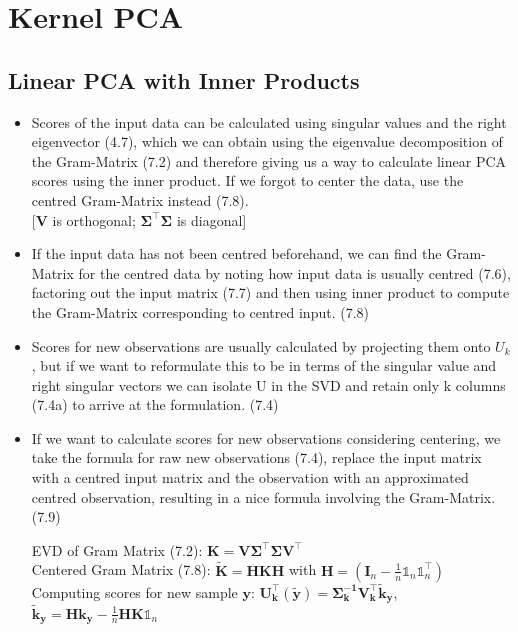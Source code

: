 \documentclass[english]{latex4ei/latex4ei_sheet}
\begin{document}
\vspace{300}
\section{Kernel PCA}
\begin{sectionbox}
\subsection{Linear PCA with Inner Products}
\begin{itemize}
\item Scores of the input data can be calculated using singular values and the right eigenvector (4.7), which we can obtain using the eigenvalue decomposition of the Gram-Matrix (7.2) and therefore giving us a way to calculate linear PCA scores using the inner product. If we forgot to center the data, use the centred Gram-Matrix instead (7.8).\\
\hspace{5}[$\mathbf{V}$ is orthogonal; $\mathbf{\Sigma}^{\top}\mathbf{\Sigma}$ is diagonal]
\item If the input data has not been centred beforehand, we can find the Gram-Matrix for the centred data by noting how input data is usually centred (7.6), factoring out the input matrix (7.7) and then using inner product to compute the Gram-Matrix  corresponding to centred input. (7.8)
\item Scores for new observations are usually calculated by projecting them onto $U_k$, but if we want to reformulate this to be in terms of the singular value and right singular vectors we can isolate U in the SVD and retain only k columns (7.4a) to arrive at the formulation. (7.4)
\item If we want to calculate scores for new observations considering centering, we take the formula for raw new observations (7.4), replace the input matrix with a centred input matrix and the observation with an approximated centred observation, resulting in a nice formula involving the Gram-Matrix. (7.9)
\begin{emphbox}
    EVD of Gram Matrix (7.2): $\mathbf{K=V\Sigma^{\top}\Sigma V^{\top}}$\\
    Centered Gram Matrix (7.8): $\mathbf{\tilde{K}=HKH}$ with $\mathbf{H}=(\mathbf{I}_n-\frac{1}{n}\mathds{1}_n\mathds{1}_n^{\top})$\\
    Computing scores for new sample $\mathbf{y}$:
    $\mathbf{U_k^{\top}}(\mathbf{\tilde{y}})=\mathbf{\Sigma_k^{-1}V_k^{\top}\tilde{k}_y}$, \quad $\mathbf{\tilde{k}_y=Hk_y-}\frac{1}{n}\mathbf{HK}\mathds{1}_n$

\end{emphbox}
\end{itemize}
\end{sectionbox}
\end{document}

